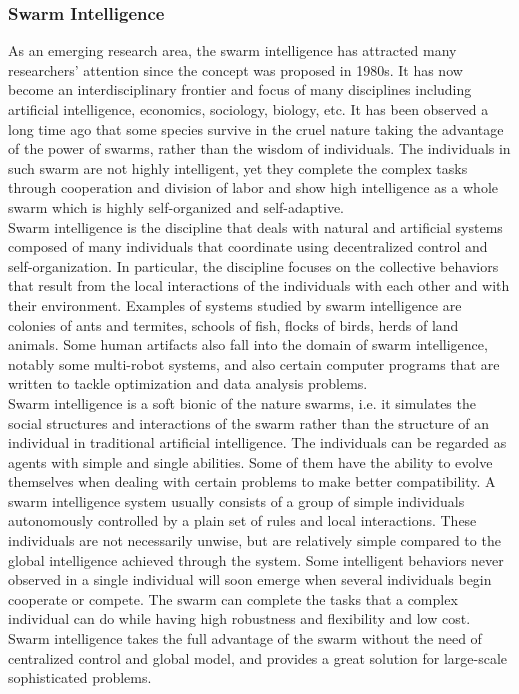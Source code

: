 \subsubsection{Swarm Intelligence}
As an emerging research area, the swarm intelligence has attracted many researchers' attention since the concept was proposed in 1980s. It has now become an interdisciplinary frontier and focus of many disciplines including artificial intelligence, economics, sociology, biology, etc. It has been observed a long time ago that some species survive in the cruel nature taking the advantage of the power of swarms, rather than the wisdom of individuals. The individuals in such swarm are not highly intelligent, yet they complete the complex tasks through cooperation and division of labor and show high intelligence as a whole swarm which is highly self-organized and self-adaptive.\\
Swarm intelligence is the discipline that deals with natural and artificial systems composed of many individuals that coordinate using decentralized control and self-organization. In particular, the discipline focuses on the collective behaviors that result from the local interactions of the individuals with each other and with their environment. Examples of systems studied by swarm intelligence are colonies of ants and termites, schools of fish, flocks of birds, herds of land animals. Some human artifacts also fall into the domain of swarm intelligence, notably some multi-robot systems, and also certain computer programs that are written to tackle optimization and data analysis problems.\\
Swarm intelligence is a soft bionic\cite{swarmintel} of the nature swarms, i.e. it simulates the social structures and interactions of the swarm rather than the structure of an individual in traditional artificial intelligence. The individuals can be regarded as agents with simple and single abilities. Some of them have the ability to evolve themselves when dealing with certain problems to make better compatibility. A swarm intelligence system usually consists of a group of simple individuals autonomously controlled by a plain set of rules and local interactions. These individuals are not necessarily unwise, but are relatively simple compared to the global intelligence achieved through the system. Some intelligent behaviors never observed in a single individual will soon emerge when several individuals begin cooperate or compete. The swarm can complete  the tasks that a complex individual can do while having high robustness and flexibility and low cost. Swarm intelligence takes the full advantage of the swarm without the need of centralized control and global model, and provides a great solution for large-scale sophisticated problems.\\
